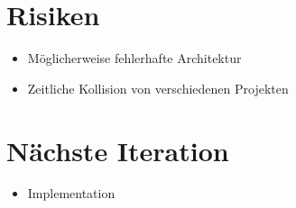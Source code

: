 \documentclass[a4paper, 12pt]{scrartcl} %
\begin{document}
\section*{Risiken}
\begin{itemize}
\item Möglicherweise fehlerhafte Architektur
\item Zeitliche Kollision von verschiedenen Projekten
\end{itemize}
\section*{Nächste Iteration}
\begin{itemize}
\item Implementation
\end{itemize}
\end{document}

